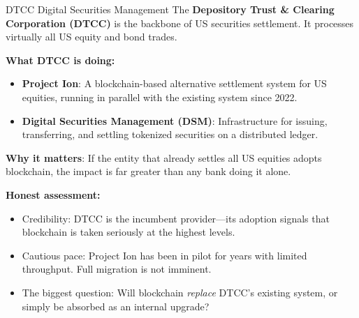 \documentclass[10pt]{beamer}
\newcommand{\highlight}[1]{\textcolor{AccentOrange}{\textbf{#1}}}
\newcommand{\good}[1]{\textcolor{AccentGreen}{#1}}
\newcommand{\bad}[1]{\textcolor{AccentOrange}{#1}}
\begin{document}
\begin{frame}{DTCC Digital Securities Management}
  The \highlight{Depository Trust \& Clearing Corporation (DTCC)} is the backbone of US securities settlement. It processes virtually all US equity and bond trades.
  
  \vspace{0.5em}
  \textbf{What DTCC is doing:}
  \begin{itemize}
    \item \textbf{Project Ion}: A blockchain-based alternative settlement system for US equities, running in parallel with the existing system since 2022.
    \item \textbf{Digital Securities Management (DSM)}: Infrastructure for issuing, transferring, and settling tokenized securities on a distributed ledger.
  \end{itemize}
  
  \vspace{0.5em}
  \textbf{Why it matters}: If the entity that already settles all US equities adopts blockchain, the impact is far greater than any bank doing it alone.
  
  \vspace{0.5em}
  \textbf{Honest assessment:}
  \begin{itemize}
    \item \good{Credibility}: DTCC is the incumbent provider---its adoption signals that blockchain is taken seriously at the highest levels.
    \item \bad{Cautious pace}: Project Ion has been in pilot for years with limited throughput. Full migration is not imminent.
    \item The biggest question: Will blockchain \textit{replace} DTCC's existing system, or simply be absorbed as an internal upgrade? 
  \end{itemize}
\end{frame}
\end{document}
